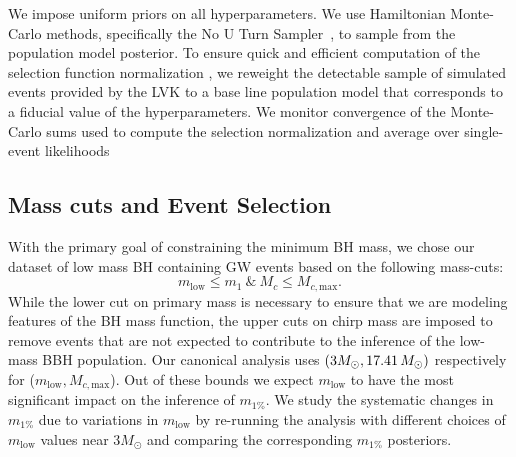\documentclass[modern]{aastex631}
\begin{document}
We impose uniform priors on all hyperparameters. We use Hamiltonian Monte-Carlo
methods, specifically the No U Turn Sampler~\citep[NUTS, ][]{HMC, HMC-NUTS}, to
sample from the population model posterior. To ensure quick and efficient
computation of the selection function normalization \citep{Mandel:2018mve}, we
reweight the detectable sample of simulated events provided by the LVK
\citep{KAGRA:2021duu} to a base line population model that corresponds to a
fiducial value of the hyperparameters.  We monitor convergence of the
Monte-Carlo sums used to compute the selection normalization and average over
single-event likelihoods \citep{Pdet1-Farr,Pdet2-essick,Talbot2023}

\subsection{Mass cuts and Event Selection}
With the primary goal of constraining the minimum BH mass, we chose our dataset of low mass BH containing GW events based on the following mass-cuts:
\begin{equation}
   m_\mathrm{low}\leq m_1 ~\&~M_c\leq M_{c,\mathrm{max}}.
\end{equation}
While the lower cut on primary mass is necessary to ensure that we are modeling
features of the BH mass function, the upper cuts on chirp mass are
imposed to remove events that are not expected to contribute to the inference of
the low-mass BBH population. Our canonical analysis uses $(3M_{\odot},
17.41 \, M_\odot)$ respectively for ($m_\mathrm{low},
M_{c,\mathrm{max}}$). Out of these bounds we expect $m_\mathrm{low}$ to
have the most significant impact on the inference of $m_{1\%}$. We study the
systematic changes in $m_{1\%}$ due to variations in $m_\mathrm{low}$ by re-running the analysis with different choices of $m_\mathrm{low}$ values near $3M_{\odot}$ and comparing the
corresponding $m_{1\%}$ posteriors.
\end{document}
